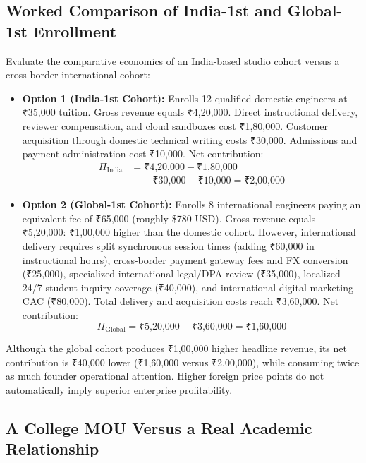 \subsection{Worked Comparison of India-1st and Global-1st Enrollment}
\label{sec:worked_comparison_india_versus_global}

Evaluate the comparative economics of an India-based studio cohort versus a cross-border international cohort:
\begin{itemize}
\item \textbf{Option 1 (India-1st Cohort):} Enrolls 12 qualified domestic engineers at ₹35,000 tuition. Gross revenue equals ₹4,20,000. Direct instructional delivery, reviewer compensation, and cloud sandboxes cost ₹1,80,000. Customer acquisition through domestic technical writing costs ₹30,000. Admissions and payment administration cost ₹10,000. Net contribution:
\begin{equation}
\label{eq:india_cohort_contribution}
\begin{aligned}
\Pi_{\text{India}} &= \text{₹4,20,000} - \text{₹1,80,000} \\
&\quad - \text{₹30,000} - \text{₹10,000} = \text{₹2,00,000}
\end{aligned}
\end{equation}
\item \textbf{Option 2 (Global-1st Cohort):} Enrolls 8 international engineers paying an equivalent fee of ₹65,000 (roughly \$780 USD). Gross revenue equals ₹5,20,000: ₹1,00,000 higher than the domestic cohort. However, international delivery requires split synchronous session times (adding ₹60,000 in instructional hours), cross-border payment gateway fees and FX conversion (₹25,000), specialized international legal/DPA review (₹35,000), localized 24/7 student inquiry coverage (₹40,000), and international digital marketing CAC (₹80,000). Total delivery and acquisition costs reach ₹3,60,000. Net contribution:
\begin{equation}
\label{eq:global_cohort_contribution}
\Pi_{\text{Global}} = \text{₹5,20,000} - \text{₹3,60,000} = \text{₹1,60,000}
\end{equation}
\end{itemize}
Although the global cohort produces ₹1,00,000 higher headline revenue, its net contribution is ₹40,000 lower (₹1,60,000 versus ₹2,00,000), while consuming twice as much founder operational attention. Higher foreign price points do not automatically imply superior enterprise profitability.

\subsection{A College MOU Versus a Real Academic Relationship}
\label{sec:mou_versus_real_relationship}

